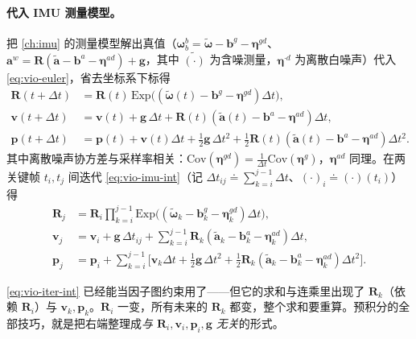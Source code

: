 \paragraph{代入 IMU 测量模型。}
把 \cref{ch:imu} 的测量模型解出真值（$\boldsymbol{\omega}^b_b=\tilde{\boldsymbol{\omega}}-\mathbf{b}^g-\boldsymbol{\eta}^{gd}$、$\mathbf{a}^w=\mathbf{R}(\tilde{\mathbf{a}}-\mathbf{b}^a-\boldsymbol{\eta}^{ad})+\mathbf{g}$，其中 $\tilde{(\cdot)}$ 为含噪测量，$\boldsymbol{\eta}^{\cdot d}$ 为离散白噪声）代入 \cref{eq:vio-euler}，省去坐标系下标得
\begin{equation}
\begin{aligned}
  \mathbf{R}(t+\Delta t)&=\mathbf{R}(t)\,\mathrm{Exp}\!\big((\tilde{\boldsymbol{\omega}}(t)-\mathbf{b}^g-\boldsymbol{\eta}^{gd})\Delta t\big),\\
  \mathbf{v}(t+\Delta t)&=\mathbf{v}(t)+\mathbf{g}\,\Delta t+\mathbf{R}(t)(\tilde{\mathbf{a}}(t)-\mathbf{b}^a-\boldsymbol{\eta}^{ad})\Delta t,\\
  \mathbf{p}(t+\Delta t)&=\mathbf{p}(t)+\mathbf{v}(t)\Delta t+\tfrac12\mathbf{g}\,\Delta t^2+\tfrac12\mathbf{R}(t)(\tilde{\mathbf{a}}(t)-\mathbf{b}^a-\boldsymbol{\eta}^{ad})\Delta t^2.
\end{aligned}
  \label{eq:vio-imu-int}
\end{equation}
其中离散噪声协方差与采样率相关：$\mathrm{Cov}(\boldsymbol{\eta}^{gd})=\tfrac{1}{\Delta t}\mathrm{Cov}(\boldsymbol{\eta}^g)$，$\boldsymbol{\eta}^{ad}$ 同理\cite{forster2017preintegration}。在两关键帧 $t_i,t_j$ 间迭代 \cref{eq:vio-imu-int}（记 $\Delta t_{ij}\doteq\sum_{k=i}^{j-1}\Delta t$、$(\cdot)_i\doteq(\cdot)(t_i)$）得
\begin{equation}
\begin{aligned}
  \mathbf{R}_j&=\mathbf{R}_i\prod_{k=i}^{j-1}\mathrm{Exp}\!\big((\tilde{\boldsymbol{\omega}}_k-\mathbf{b}^g_k-\boldsymbol{\eta}^{gd}_k)\Delta t\big),\\
  \mathbf{v}_j&=\mathbf{v}_i+\mathbf{g}\,\Delta t_{ij}+\sum_{k=i}^{j-1}\mathbf{R}_k(\tilde{\mathbf{a}}_k-\mathbf{b}^a_k-\boldsymbol{\eta}^{ad}_k)\Delta t,\\
  \mathbf{p}_j&=\mathbf{p}_i+\sum_{k=i}^{j-1}\Big[\mathbf{v}_k\Delta t+\tfrac12\mathbf{g}\,\Delta t^2+\tfrac12\mathbf{R}_k(\tilde{\mathbf{a}}_k-\mathbf{b}^a_k-\boldsymbol{\eta}^{ad}_k)\Delta t^2\Big].
\end{aligned}
  \label{eq:vio-iter-int}
\end{equation}

\begin{insight}
\cref{eq:vio-iter-int} 已经能当因子图约束用了——但它的求和与连乘里出现了 $\mathbf{R}_k$（依赖 $\mathbf{R}_i$）与 $\mathbf{v}_k,\mathbf{p}_k$。$\mathbf{R}_i$ 一变，所有未来的 $\mathbf{R}_k$ 都变，整个求和要重算。预积分的全部技巧，就是把右端整理成\emph{与 $\mathbf{R}_i,\mathbf{v}_i,\mathbf{p}_i,\mathbf{g}$ 无关}的形式。
\end{insight}

